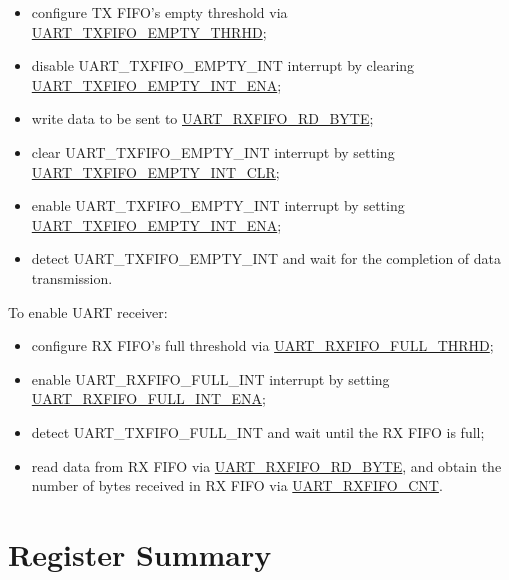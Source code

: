 \documentclass[main\_\_EN.tex]{subfiles}
\begin{document}
\begin{itemize}
    \item configure TX FIFO's empty threshold via \hyperref[fielddesc:UARTTXFIFOEMPTYTHRHD]{UART\_TXFIFO\_EMPTY\_THRHD};
    \item disable UART\_TXFIFO\_EMPTY\_INT interrupt by clearing \hyperref[fielddesc:UARTTXFIFOEMPTYINTENA]{UART\_TXFIFO\_EMPTY\_INT\_ENA};
    \item write data to be sent to \hyperref[fielddesc:UARTRXFIFORDBYTE]{UART\_RXFIFO\_RD\_BYTE};
    \item clear UART\_TXFIFO\_EMPTY\_INT interrupt by setting  \hyperref[fielddesc:UARTTXFIFOEMPTYINTCLR]{UART\_TXFIFO\_EMPTY\_INT\_CLR};
    \item enable UART\_TXFIFO\_EMPTY\_INT interrupt by setting \hyperref[fielddesc:UARTTXFIFOEMPTYINTENA]{UART\_TXFIFO\_EMPTY\_INT\_ENA};
    \item detect UART\_TXFIFO\_EMPTY\_INT and wait for the completion of data transmission.
\end{itemize}

To enable UART receiver:
\begin{itemize}
    \item configure RX FIFO's full threshold via \hyperref[fielddesc:UARTRXFIFOFULLTHRHD]{UART\_RXFIFO\_FULL\_THRHD};
    \item enable UART\_RXFIFO\_FULL\_INT interrupt by setting \hyperref[fielddesc:UARTRXFIFOFULLINTENA]{UART\_RXFIFO\_FULL\_INT\_ENA};
    \item detect UART\_TXFIFO\_FULL\_INT and wait until the RX FIFO is full;
    \item read data from RX FIFO via  \hyperref[fielddesc:UARTRXFIFORDBYTE]{UART\_RXFIFO\_RD\_BYTE}, and obtain the number of bytes received in RX FIFO via \hyperref[fielddesc:UARTRXFIFOCNT]{UART\_RXFIFO\_CNT}.
\end{itemize}




\clearpage
\section{Register Summary}
\label{sec:uart-reg-summ}
\hypertarget{uart-reg-summ}{}
\end{document}
